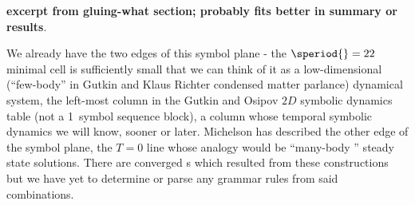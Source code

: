 \begin{description}
{\textbf{excerpt from gluing-what section; probably fits better in summary or results}.

We already have the two edges of this symbol plane - the $\speriod{}=22$ minimal
cell is sufficiently small that we can think of it as
a low-dimensional (``few-body'' in Gutkin and Klaus
Richter condensed matter parlance)
dynamical system, the left-most column in the Gutkin and
Osipov $2D$ symbolic dynamics {\spt} table (not a
1\dmn\ symbol sequence block), a column whose temporal symbolic dynamics
we will know, sooner or later. Michelson has described the other
edge of the symbol plane, the $T=0$ line whose analogy would be ``many-body '' steady state solutions.
There are converged {\po}s which resulted from these constructions but
we have yet to determine or parse any grammar rules from said combinations.
}

\end{description}
